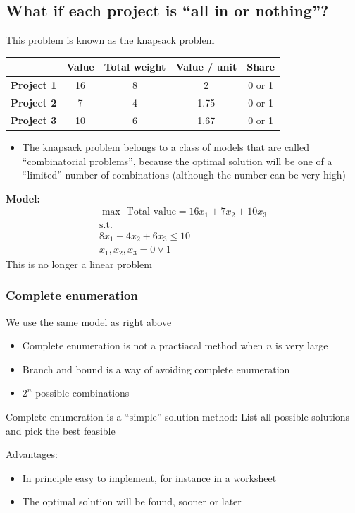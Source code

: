 \documentclass[10pt]{article}
\begin{document}
\subsection{What if each project is ``all in or nothing''?}
This problem is known as the knapsack problem 
\begin{center}
    \begin{tabular}{|c|c|c|c|c|}
        \hline 
        & \textbf{Value} & \textbf{Total weight} & \textbf{Value / unit} & \textbf{Share}\\\hline 
        \textbf{Project 1} & 16 & 8 & 2 & 0 or 1\\\hline
        \textbf{Project 2} & 7 & 4 & 1.75 & 0 or 1\\\hline
        \textbf{Project 3} & 10 & 6 & 1.67 & 0 or 1\\\hline
    \end{tabular}
\end{center}
\begin{itemize}
    \item The knapsack problem belongs to a class of models that are called ``combinatorial problems'', because the optimal solution will be one of a ``limited'' number of combinations (although the number can be very high)
\end{itemize}
\textbf{Model:}
\begin{gather*}
    \max \text{ Total value} = 16x_1 + 7x_2 + 10x_3\\
    \text{s.t.}\\
    8x_1 + 4x_2 + 6x_3 \le 10\\
    x_1, x_2, x_3 = 0\lor 1
\end{gather*}
This is no longer a linear problem 
\subsubsection{Complete enumeration}
We use the same model as right above
\begin{itemize}
    \item Complete enumeration is not a practiacal method when $n $ is very large 
    \item Branch and bound is a way of avoiding complete enumeration
    \item $2^n $ possible combinations 
\end{itemize}
Complete enumeration is a ``simple'' solution method: List all possible solutions and pick the best feasible 

Advantages: 
\begin{itemize}
    \item In principle easy to implement, for instance in a worksheet 
    \item The optimal solution will be found, sooner or later 
\end{itemize}
\end{document}
